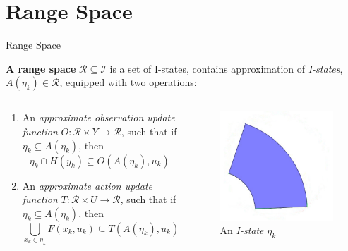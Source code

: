 \documentclass[10pt]{beamer}
\begin{document}
\section[Range Space]{Range Space}
\begin{frame}{Range Space}
  \begin{definition}{\textbf{A range space}}
    $\mathcal{R} \subseteq \mathcal{I}$ is a set of I-states, contains
    approximation of \emph{I-states}, $A(\eta_k) \in \mathcal{R}$, equipped with
    two operations:
  \end{definition}
  \begin{columns}
    \begin{column}{.5\textwidth}
      \begin{enumerate}
      \item An \emph{approximate observation update function} $O: \mathcal{R} \times
        Y \to \mathcal{R}$, such that if $\eta_k \subseteq A(\eta_k)$, then
        $$\eta_k \cap H(y_k) \subseteq O(A(\eta_k), u_k)$$
      \item An \emph{approximate action update function} $T: \mathcal{R} \times U \to
        \mathcal{R}$, such that if $\eta_k \subseteq A(\eta_k)$, then
        $$\bigcup_{x_k \in \eta_k} F(x_k, u_k) \subseteq T(A(\eta_k), u_k)$$
      \end{enumerate}
    \end{column}
    \begin{column}{.4\textwidth}
    \begin{figure}
      \includegraphics[scale=0.3]{figs/norangespace.jpg}
      \caption{An \emph{I-state} $\eta_k$}
    \end{figure}
  \end{column}
\end{columns}
\end{frame}
\end{document}

